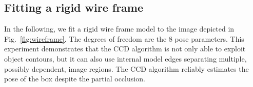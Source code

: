 

\subsection{Fitting a rigid wire frame}
\label{sec:fdo}
In the following, we fit a rigid wire frame model to the image
depicted in Fig.~\ref{fig:wireframe}.  The degrees of freedom
are the 8 pose parameters. This experiment demonstrates that the CCD
algorithm is not only able to exploit object contours, but it can also
use internal model edges separating multiple, possibly dependent,
image regions.  The CCD algorithm reliably estimates the pose of the box despite
the partial occlusion.

\begin{figure}[htbp] 
  \begin{minipage}[t]{0.5\linewidth} 
    \centering  
  \end{minipage}%
  \begin{minipage}[t]{0.5\linewidth} 
    \centering 
  \end{minipage} 
  \begin{minipage}[t]{0.5\linewidth} 
    \centering 

\end{minipage}
\end{figure}
